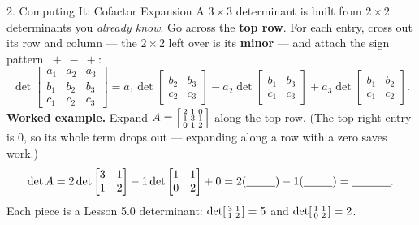 \documentclass[10pt]{article}
\begin{document}
\begin{notesbox}{2. Computing It: Cofactor Expansion}
A $3\times3$ determinant is built from $2\times2$ determinants you \emph{already know}. Go across the
\textbf{top row}. For each entry, cross out its row and column --- the $2\times2$ left over is its
\textbf{minor} --- and attach the sign pattern $\;{+}\;{-}\;{+}$:
\[
  \det\begin{bmatrix} a_1 & a_2 & a_3 \\ b_1 & b_2 & b_3 \\ c_1 & c_2 & c_3 \end{bmatrix}
  = a_1\det\begin{bmatrix} b_2 & b_3 \\ c_2 & c_3 \end{bmatrix}
  - a_2\det\begin{bmatrix} b_1 & b_3 \\ c_1 & c_3 \end{bmatrix}
  + a_3\det\begin{bmatrix} b_1 & b_2 \\ c_1 & c_2 \end{bmatrix}.
\]
\textbf{Worked example.} Expand $A=\begin{bsmallmatrix} 2 & 1 & 0 \\ 1 & 3 & 1 \\ 0 & 1 & 2 \end{bsmallmatrix}$
along the top row. (The top-right entry is $0$, so its whole term drops out --- expanding along a row
with a zero saves work.)
\[
  \det A = 2\det\begin{bmatrix} 3 & 1 \\ 1 & 2 \end{bmatrix}
         - 1\det\begin{bmatrix} 1 & 1 \\ 0 & 2 \end{bmatrix}
         + 0
         = 2(\blank{0.9cm}) - 1(\blank{0.9cm}) = \blank{1.2cm}.
\]
Each piece is a Lesson 5.0 determinant: $\det\begin{bsmallmatrix} 3 & 1 \\ 1 & 2 \end{bsmallmatrix}=5$
and $\det\begin{bsmallmatrix} 1 & 1 \\ 0 & 2 \end{bsmallmatrix}=2$.
\end{notesbox}
\end{document}
